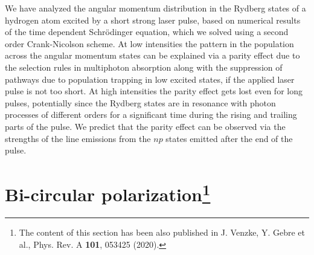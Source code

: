 We have analyzed the angular momentum distribution in the Rydberg states of a hydrogen atom excited by a short strong laser pulse, based on numerical results of the time dependent Schr\"odinger equation, which we solved using a second order Crank-Nicolson scheme. At low intensities the pattern in the population across the angular momentum states can be explained via a parity effect due to the selection rules in multiphoton absorption along with the suppression of pathways due to population trapping in low excited states, if the applied laser pulse is not too short. At high intensities the parity effect gets lost even for long pulses, potentially since the Rydberg states are in resonance with photon processes of different orders for a significant time during the rising and trailing parts of the pulse. We predict that the parity effect can be observed via the strengths of the line emissions from the $np$ states emitted after the end of the pulse. 

\section[Bi-circular polarization]{Bi-circular polarization\protect\footnote{The content of this section has been also published in J. Venzke, Y. Gebre et al., Phys. Rev. A \textbf{101}, 053425  (2020).}} %
\label{sec:bi_circular_polarization}

